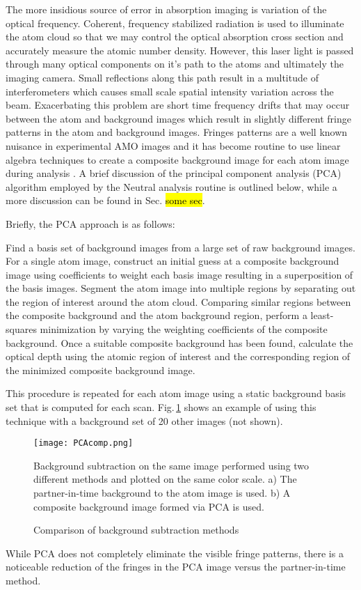 The more insidious source of error in absorption imaging is variation of the optical frequency. 
Coherent, frequency stabilized radiation is used to illuminate the atom cloud so that we may control the optical absorption cross section and accurately measure the atomic number density. 
However, this laser light is passed through many optical components on it's path to the atoms and ultimately the imaging camera. 
Small reflections along this path result in a multitude of interferometers which causes small scale spatial intensity variation across the beam. 
Exacerbating this problem are short time frequency drifts that may occur between the atom and background images which result in slightly different fringe patterns in the atom and background images. 
Fringes patterns are a well known nuisance in experimental AMO images and it has become routine to use linear algebra techniques to create a composite background image for each atom image during analysis \cite{Segal2009}. 
A brief discussion of the principal component analysis (PCA) algorithm employed by the Neutral analysis routine is outlined below, while a more discussion can be found in Sec. \hl{some sec}. 

Briefly, the PCA approach is as follows:
\begin{outline}[enumerate]
	\1 Find a basis set of background images from a large set of raw background images.
	\1 For a single atom image, construct an initial guess at a composite background image using coefficients to weight each basis image resulting in a superposition of the basis images.
	\1 Segment the atom image into multiple regions by separating out the region of interest around the atom cloud.
	\1 Comparing similar regions between the composite background and the atom background region, perform a least-squares minimization by varying the weighting coefficients of the composite background.
	\1 Once a suitable composite background has been found, calculate the optical depth using the atomic region of interest and the corresponding region of the minimized composite background image.
\end{outline}
This procedure is repeated for each atom image using a static background basis set that is computed for each scan.
Fig.\,\ref{fig:PCAcomp} shows an example of using this technique with a background set of 20 other images (not shown).
	\begin{figure}
	\centerline{
		\texttt{[image: PCAcomp.png]}}
		\caption{Comparison of background subtraction methods}{Background subtraction on the same image performed using two different methods and plotted on the same color scale. a) The partner-in-time background to the atom image is used. b) A composite background image formed via PCA is used.}
		 \label{fig:PCAcomp}
	\end{figure}
While PCA does not completely eliminate the visible fringe patterns, there is a noticeable reduction of the fringes in the PCA image versus the partner-in-time method.

